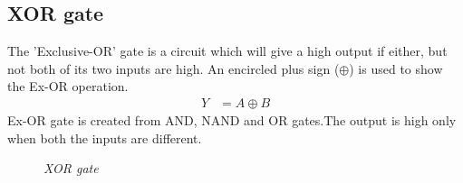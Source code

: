 	\subsection{XOR gate}
	The 'Exclusive-OR' gate is a circuit which will give a high output if either, but not both of its two inputs are high. An encircled plus sign ($\oplus$) is used to show the Ex-OR operation.
	\begin{align*}
		Y &= A \oplus B
	\end{align*}
	Ex-OR gate is created from AND, NAND and OR gates.The output is high only when both the inputs are different.
	\begin{figure}[ht]
		\centering 
		\hfill
		\hfill
		\caption{\textit{XOR gate}}
	\end{figure}
	
	
